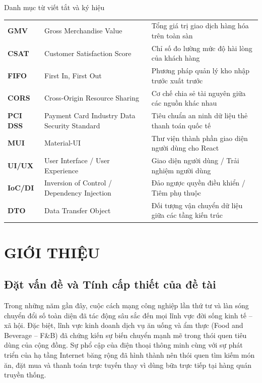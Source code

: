 \documentclass{uetgraduation}
\begin{document}
\begin{contentlisting}
\begin{contentlistingsection}{Danh mục từ viết tắt và ký hiệu}
\begin{longtable}{p{}p{}p{}}
\textbf{GMV} & Gross Merchandise Value & Tổng giá trị giao dịch hàng hóa trên toàn sàn \\
\textbf{CSAT} & Customer Satisfaction Score & Chỉ số đo lường mức độ hài lòng của khách hàng \\
\textbf{FIFO} & First In, First Out & Phương pháp quản lý kho nhập trước xuất trước \\
\textbf{CORS} & Cross-Origin Resource Sharing & Cơ chế chia sẻ tài nguyên giữa các nguồn khác nhau \\
\textbf{PCI DSS} & Payment Card Industry Data Security Standard & Tiêu chuẩn an ninh dữ liệu thẻ thanh toán quốc tế \\
\textbf{MUI} & Material-UI & Thư viện thành phần giao diện người dùng cho React \\
\textbf{UI/UX} & User Interface / User Experience & Giao diện người dùng / Trải nghiệm người dùng \\
\textbf{IoC/DI} & Inversion of Control / Dependency Injection & Đảo ngược quyền điều khiển / Tiêm phụ thuộc \\
\textbf{DTO} & Data Transfer Object & Đối tượng vận chuyển dữ liệu giữa các tầng kiến trúc \\
\hline
\end{longtable}
\end{contentlistingsection}
\end{contentlisting}

\chapter{GIỚI THIỆU}

\section{Đặt vấn đề và Tính cấp thiết của đề tài}
Trong những năm gần đây, cuộc cách mạng công nghiệp lần thứ tư và làn sóng chuyển đổi số toàn diện đã tác động sâu sắc đến mọi lĩnh vực đời sống kinh tế -- xã hội. Đặc biệt, lĩnh vực kinh doanh dịch vụ ăn uống và ẩm thực (Food and Beverage -- F\&B) đã chứng kiến sự biến chuyển mạnh mẽ trong thói quen tiêu dùng của cộng đồng. Sự phổ cập của điện thoại thông minh cùng với sự phát triển của hạ tầng Internet băng rộng đã hình thành nên thói quen tìm kiếm món ăn, đặt mua và thanh toán trực tuyến thay vì dùng bữa trực tiếp tại hàng quán truyền thống.
\end{document}
